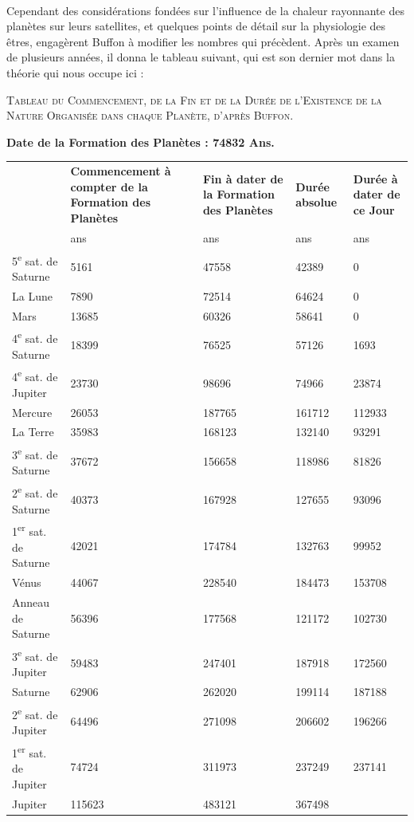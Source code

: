 \documentclass[a4paper, 11pt, oneside, landscape]{article}
\begin{document}
\paragraph{}
Cependant des considérations fondées sur l'influence de la chaleur rayonnante des planètes sur leurs satellites, et quelques points de détail sur la physiologie des êtres, engagèrent Buffon à modifier les nombres qui précèdent. Après un examen de plusieurs années, il donna le tableau suivant, qui est son dernier mot dans la théorie qui nous occupe ici :
\begin{center}
\scshape
\small
Tableau du Commencement, de la Fin et de la Durée de l'Existence de la Nature Organisée dans chaque Planète, d'après Buffon.
\end{center}
\begin{center}
\textbf{Date de la Formation des Planètes : 74832 Ans.}
\end{center}
\begin{center}
    \centering
    \footnotesize
    \begin{longtable}{l p{25mm} p{15mm} p{15mm} p{20mm}}
        ~ & \textbf{Commencement à compter de la Formation des Planètes} & \textbf{Fin à dater de la Formation des Planètes} & \textbf{Durée absolue} & \textbf{Durée à dater de ce Jour} \\
        ~ & ans & ans & ans & ans \\
        5\textsuperscript{e} sat. de Saturne & 5161 & 47558 & 42389 & 0 \\
        La Lune & 7890 & 72514 & 64624 & 0 \\
        Mars & 13685 & 60326 & 58641 & 0 \\
        4\textsuperscript{e} sat. de Saturne & 18399 & 76525 & 57126 & 1693 \\
        4\textsuperscript{e} sat. de Jupiter & 23730 & 98696 & 74966 & 23874 \\
        Mercure & 26053 & 187765 & 161712 & 112933 \\
        La Terre & 35983 & 168123 & 132140 & 93291 \\
        3\textsuperscript{e} sat. de Saturne & 37672 & 156658 & 118986 & 81826 \\
        2\textsuperscript{e} sat. de Saturne & 40373 & 167928 & 127655 & 93096 \\
        1\textsuperscript{er} sat. de Saturne & 42021 & 174784 & 132763 & 99952 \\
        Vénus & 44067 & 228540 & 184473 & 153708 \\
        Anneau de Saturne & 56396 & 177568 & 121172 & 102730 \\
        3\textsuperscript{e} sat. de Jupiter & 59483 & 247401 & 187918 & 172560 \\
        Saturne & 62906 & 262020 & 199114 & 187188 \\
        2\textsuperscript{e} sat. de Jupiter & 64496 & 271098 & 206602 & 196266 \\
        1\textsuperscript{er} sat. de Jupiter & 74724 & 311973 & 237249 & 237141 \\
        Jupiter & 115623 & 483121 & 367498 & ~ \\
    \end{longtable}
\end{center}
\end{document}
